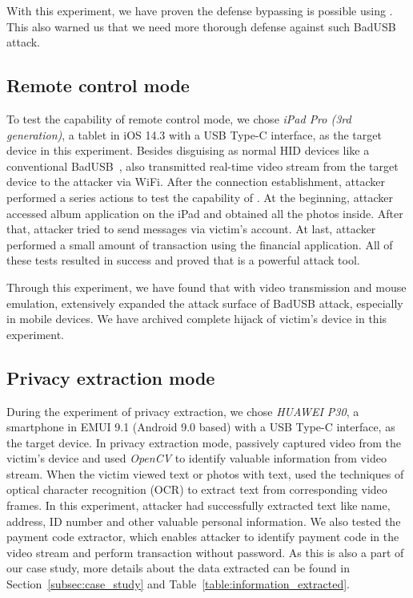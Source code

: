 With this experiment, we have proven the defense bypassing is possible using \tool. This also warned us that we need more thorough defense against such BadUSB attack.

\subsection{Remote control mode}
To test the capability of remote control mode, we chose \textit{iPad Pro (3rd generation)}, a tablet in iOS 14.3 with a USB Type-C interface, as the target device in this experiment.
Besides disguising as normal HID devices like a conventional BadUSB~\cite{badusb}, \tool also transmitted real-time video stream from the target device to the attacker via WiFi.
After the connection establishment, attacker performed a series actions to test the capability of \tool. At the beginning, attacker accessed album application on the iPad and obtained all the photos inside. After that, attacker tried to send messages via victim's account. At last, attacker performed a small amount of transaction using the financial application. All of these tests resulted in success and proved that \tool is a powerful attack tool.

Through this experiment, we have found that with video transmission and mouse emulation, \tool extensively expanded the attack surface of BadUSB attack, especially in mobile devices. We have archived complete hijack of victim's device in this experiment.

\subsection{Privacy extraction mode}
During the experiment of privacy extraction, we chose \textit{HUAWEI P30}, a smartphone in EMUI 9.1 (Android 9.0 based) with a USB Type-C interface, as the target device.
In privacy extraction mode, \tool passively captured video from the victim's device and used \textit{OpenCV} to identify valuable information from video stream. 
When the victim viewed text or photos with text, \tool used the techniques of optical character recognition (OCR) to extract text from corresponding video frames.
In this experiment, attacker had successfully extracted text like name, address, ID number and other valuable personal information. We also tested the payment code extractor, which enables attacker to identify payment code in the video stream and perform transaction without password. As this is also a part of our case study, more details about the data extracted can be found in Section~\ref{subsec:case_study} and Table~\ref{table:information_extracted}.

